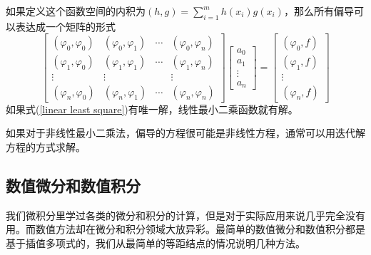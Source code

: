 \documentclass[12pt,a4paper,openany,twoside]{book}
\numberwithin{equation}{section}
\begin{document}
      如果定义这个函数空间的内积为$(h, g)=\sum_{i=1}^{m} h\left(x_{i}\right) g\left(x_{i}\right)$，那么所有偏导可以表达成一个矩阵的形式
      \begin{equation}
        \left[ \begin{array}{cccc}{\left(\varphi_{0}, \varphi_{0}\right)} & {\left(\varphi_{0}, \varphi_{1}\right)}&{ \cdots}&{\left(\varphi_{0}, \varphi_{n}\right)} \\ {\left(\varphi_{1}, \varphi_{0}\right)} & {\left(\varphi_{1}, \varphi_{1}\right) } & {\cdots} & {\left(\varphi_{1}, \varphi_{n}\right)} \\ {\vdots} & {\vdots}&{} & {\vdots} \\ {\left(\varphi_{n}, \varphi_{0}\right)} & {\left(\varphi_{n}, \varphi_{1}\right) } & {\cdots} & {\left(\varphi_{n}, \varphi_{n}\right)}\end{array}\right] \left[ \begin{array}{c}{a_{0}} \\ {a_{1}} \\ {\vdots} \\ {a_{n}}\end{array}\right]=\left[ \begin{array}{c}{\left(\varphi_{0}, f\right)} \\ {\left(\varphi_{1}, f\right)} \\ {\vdots} \\ {\left(\varphi_{n}, f\right)}\end{array}\right]
        \label{linear least square}
      \end{equation}
      如果式(\ref{linear least square})有唯一解，线性最小二乘函数就有解。

      如果对于非线性最小二乘法，偏导的方程很可能是非线性方程，通常可以用迭代解方程的方式求解。
    \subsection{数值微分和数值积分}
      我们微积分里学过各类的微分和积分的计算，但是对于实际应用来说几乎完全没有用。而数值方法却在微分和积分领域大放异彩。最简单的数值微分和数值积分都是基于插值多项式的，我们从最简单的等距结点的情况说明几种方法。
\end{document}
